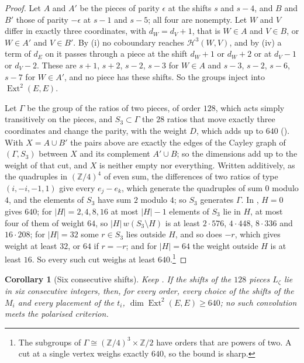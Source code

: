 \documentclass[11pt,reqno]{amsart}
\theoremstyle{plain}
\newtheorem{corollary}[theorem]{Corollary}
\theoremstyle{definition}
\theoremstyle{remark}
\newcommand{\ZZ}{\mathbb{Z}}
\newcommand{\cH}{\mathcal{H}}
\DeclareMathOperator{\Ext}{Ext}
\begin{document}
\begin{proof}
Let $A$ and $A'$ be the pieces of parity $\epsilon$ at the shifts $s$ and
$s-4$, and $B$ and $B'$ those of parity $-\epsilon$ at $s-1$ and $s-5$; all
four are nonempty. Let $W$ and $V$ differ in exactly three coordinates, with
$d_{W}=d_{V}+1$, that is $W\in A$ and $V\in B$, or $W\in A'$ and $V\in B'$.
By (i) no coboundary reaches $\cH^{3}(W,V)$, and by
(iv) a term of $d_{E}$ on it passes through a piece at
the shift $d_{W}+1$ or $d_{W}+2$ or at $d_{V}-1$ or $d_{V}-2$. These are
$s+1$, $s+2$, $s-2$, $s-3$ for $W\in A$ and $s-3$, $s-2$, $s-6$, $s-7$ for
$W\in A'$, and no piece has these shifts. So the groups inject into
$\Ext^{2}(E,E)$.

Let $\Gamma$ be the group of the ratios of two pieces, of order $128$,
which acts simply transitively on the pieces, and $S_{3}\subset\Gamma$ the
$28$ ratios that move exactly three coordinates and change the parity, with
the weight $D$, which adds up to $640$ (). With
$X=A\cup B'$ the pairs above are exactly the edges of the Cayley graph of
$(\Gamma,S_{3})$ between $X$ and its complement $A'\cup B$; so the
dimensions add up to the weight of that cut, and $X$ is neither empty nor
everything. Written additively, as the quadruples in $(\ZZ/4)^{4}$ of even
sum, the differences of two ratios of type $(i,-i,-1,1)$ give every
$e_{j}-e_{k}$, which generate the quadruples of sum $0$ modulo $4$, and the
elements of $S_{3}$ have sum $2$ modulo $4$; so $S_{3}$ generates $\Gamma$.
In ,
$H=0$ gives $640$; for $|H|=2,4,8,16$ at most $|H|-1$ elements of $S_{3}$ lie
in $H$, at most four of them of weight $64$, so $|H|\,w(S_{3}\setminus H)$ is
at least $2\cdot576$, $4\cdot448$, $8\cdot336$ and $16\cdot208$; for
$|H|=32$ some $r\in S_{3}$ lies outside $H$, and so does $-r$, which gives
weight at least $32$, or $64$ if $r=-r$; and for $|H|=64$ the weight outside
$H$ is at least $16$. So every such cut weighs at least $640$.\footnote{The
subgroups of $\Gamma\cong(\ZZ/4)^{3}\times\ZZ/2$ have orders that are powers
of two. A cut at a single vertex weighs exactly $640$, so the bound is
sharp.}
\end{proof}

\begin{corollary}[Six consecutive shifts]\label{cor:efoursix}
Keep . If the shifts of the $128$ pieces $L_{\zeta}$
lie in six consecutive integers, then, for every order, every choice of the
shifts of the $M_{i}$ and every placement of the $t_{i}$,
$\dim\Ext^{2}(E,E)\ge640$; no such convolution meets the polarised
criterion.
\end{corollary}
\end{document}

